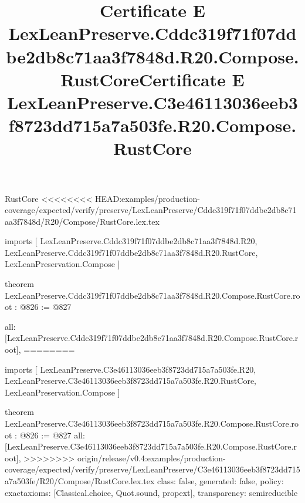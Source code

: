 \begin{lexlean}{RustCore}
<<<<<<<< HEAD:examples/production-coverage/expected/verify/preserve/LexLeanPreserve/Cddc319f71f07ddbe2db8c71aa3f7848d/R20/Compose/RustCore.lex.tex
\title{Certificate E LexLeanPreserve.Cddc319f71f07ddbe2db8c71aa3f7848d.R20.Compose.RustCore}
\begin{coremodule}
imports [
  LexLeanPreserve.Cddc319f71f07ddbe2db8c71aa3f7848d.R20,
  LexLeanPreserve.Cddc319f71f07ddbe2db8c71aa3f7848d.R20.RustCore,
  LexLeanPreservation.Compose
]

theorem LexLeanPreserve.Cddc319f71f07ddbe2db8c71aa3f7848d.R20.Compose.RustCore.root : @826 := @827 {
  all: [LexLeanPreserve.Cddc319f71f07ddbe2db8c71aa3f7848d.R20.Compose.RustCore.root],
========
\title{Certificate E LexLeanPreserve.C3e46113036eeb3f8723dd715a7a503fe.R20.Compose.RustCore}
\begin{coremodule}
imports [
  LexLeanPreserve.C3e46113036eeb3f8723dd715a7a503fe.R20,
  LexLeanPreserve.C3e46113036eeb3f8723dd715a7a503fe.R20.RustCore,
  LexLeanPreservation.Compose
]

theorem LexLeanPreserve.C3e46113036eeb3f8723dd715a7a503fe.R20.Compose.RustCore.root : @826 := @827 {
  all: [LexLeanPreserve.C3e46113036eeb3f8723dd715a7a503fe.R20.Compose.RustCore.root],
>>>>>>>> origin/release/v0.4:examples/production-coverage/expected/verify/preserve/LexLeanPreserve/C3e46113036eeb3f8723dd715a7a503fe/R20/Compose/RustCore.lex.tex
  class: false,
  generated: false,
  policy: exact{axioms: [Classical.choice, Quot.sound, propext]},
  transparency: semireducible
}


\end{coremodule}}
\end{coremodule}
\end{lexlean}
